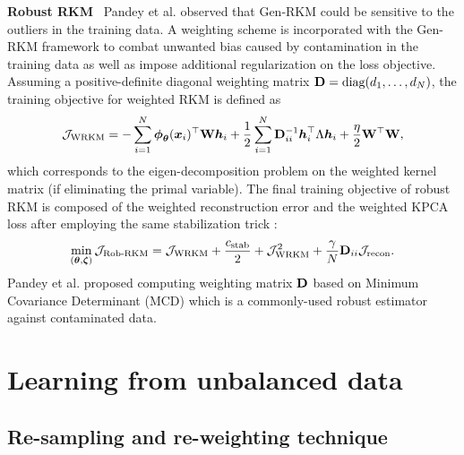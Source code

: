 \noindent\textbf{Robust RKM} \ Pandey et al. \cite{pandeyRobustGenerativeRestricted2020} observed that Gen-RKM could be sensitive to the outliers in the training data. A weighting scheme is incorporated with the Gen-RKM framework to combat unwanted bias caused by contamination in the training data as well as impose additional regularization on the loss objective. Assuming a positive-definite diagonal weighting matrix $\mathbf{D} = \text{diag}(d_1,\dots,d_N)$, the training objective for weighted RKM is defined as
\begin{equation}
    \begin{aligned}
        \mathcal{J}_{\text{WRKM}} = -\sum_{i=1}^{N}\boldsymbol{\phi}_{\boldsymbol{\theta}}(\boldsymbol{x}_i)^\top\mathbf{W}\boldsymbol{h}_i + \frac{1}{2}\sum_{i=1}^{N}\mathbf{D}_{ii}^{-1}\boldsymbol{h}_i^\top\Lambda\boldsymbol{h}_i + \frac{\eta}{2}\mathbf{W}^\top\mathbf{W}
    \end{aligned},
\end{equation}
which corresponds to the eigen-decomposition problem on the weighted kernel matrix (if eliminating the primal variable). The final training objective of robust RKM is composed of the weighted reconstruction error and the weighted KPCA loss after employing the same stabilization trick :
\begin{equation}
    \min_{(\boldsymbol{\theta},\boldsymbol{\zeta})}\mathcal{J}_{\text{Rob-RKM}} = \mathcal{J}_{\text{WRKM}} + \frac{c_{\text{stab}}}{2} + \mathcal{J}_{\text{WRKM}}^2 + \frac{\gamma}{N}\mathbf{D}_{ii}\mathcal{J}_{\text{recon}}.
\end{equation}
Pandey et al. \cite{pandeyRobustGenerativeRestricted2020} proposed computing weighting matrix $\mathbf{D}$ based on Minimum Covariance Determinant (MCD) which is a commonly-used robust estimator against contaminated data.



\section{Learning from unbalanced data}
\label{sec-learning-from-unbalanced-data}
\subsection{Re-sampling and re-weighting technique}

